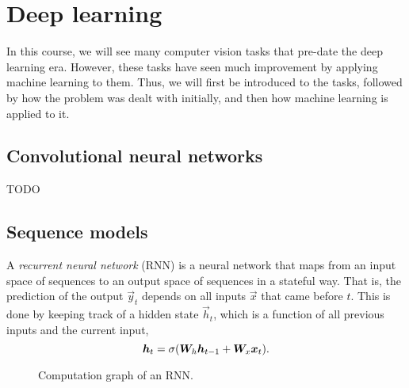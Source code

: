 \section{Deep learning}

In this course, we will see many computer vision tasks that pre-date the deep
learning era. However, these tasks have seen much improvement by applying
machine learning to them. Thus, we will first be introduced to the tasks,
followed by how the problem was dealt with initially, and then how machine
learning is applied to it.

\subsection{Convolutional neural networks}

TODO

\subsection{Sequence models}


A \textit{recurrent neural network} (RNN) \citep{rumelhart1985learning} is a
neural network that maps from an input space of sequences to an output space of
sequences in a stateful way. That is, the prediction of the output $\vec{y}_t$
depends on all inputs $\vec{x}$ that came before $t$. This is done by keeping
track of a hidden state $\vec{h}_t$, which is a function of all previous inputs
and the current input, \[
  \bm{h}_t = \sigma(\bm{W}_h\bm{h}_{t-1}+\bm{W}_x\bm{x}_t)
.\]

\begin{figure}
  \centering
  \caption{Computation graph of an RNN.}
  \label{fig:rnn}
\end{figure}


